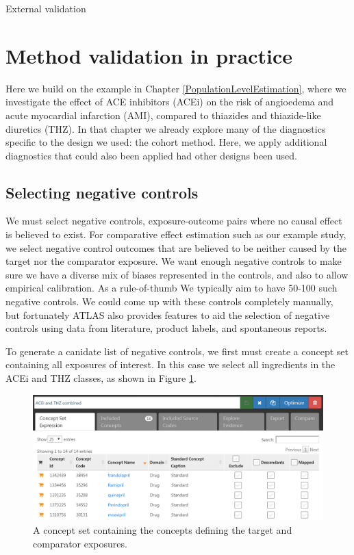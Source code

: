 \documentclass[]{book}
\begin{document}
External validation

\section{Method validation in
practice}\label{method-validation-in-practice}

Here we build on the example in Chapter \ref{PopulationLevelEstimation},
where we investigate the effect of ACE inhibitors (ACEi) on the risk of
angioedema and acute myocardial infarction (AMI), compared to thiazides
and thiazide-like diuretics (THZ). In that chapter we already explore
many of the diagnostics specific to the design we used: the cohort
method. Here, we apply additional diagnostics that could also been
applied had other designs been used.

\subsection{Selecting negative
controls}\label{selecting-negative-controls}

We must select negative controls, exposure-outcome pairs where no causal
effect is believed to exist. For comparative effect estimation such as
our example study, we select negative control outcomes that are believed
to be neither caused by the target nor the comparator exposure. We want
enough negative controls to make sure we have a diverse mix of biases
represented in the controls, and also to allow empirical calibration. As
a rule-of-thumb We typically aim to have 50-100 such negative controls.
We could come up with these controls completely manually, but
fortunately ATLAS also provides features to aid the selection of
negative controls using data from literature, product labels, and
spontaneous reports.

To generate a canidate list of negative controls, we first must create a
concept set containing all exposures of interest. In this case we select
all ingredients in the ACEi and THZ classes, as shown in Figure
\ref{fig:exposuresConceptSet}.

\begin{figure}

{\centering \includegraphics[width=1\linewidth]{images/MethodValidity/exposuresConceptSet} 

}

\caption{A concept set containing the concepts defining the target and comparator exposures.}\label{fig:exposuresConceptSet}
\end{figure}
\end{document}

